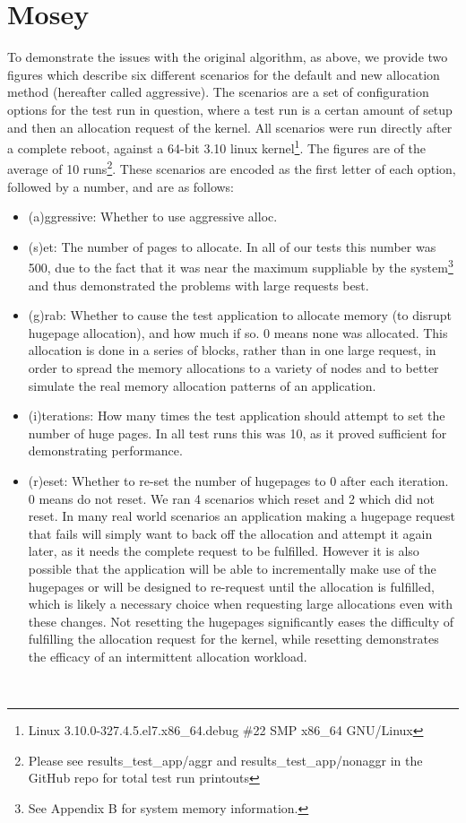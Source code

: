 \documentclass{article}
\begin{document}
\section{Mosey}
To demonstrate the issues with the original algorithm, as above, we provide two figures which describe six different scenarios for the default and new allocation method (hereafter called aggressive). The scenarios are a set of configuration options for the test run in question, where a test run is a certan amount of setup and then an allocation request of the kernel. All scenarios were run directly after a complete reboot, against a 64-bit 3.10 linux kernel\footnote{Linux 3.10.0-327.4.5.el7.x86\_64.debug \#22 SMP x86\_64 GNU/Linux}. The figures are of the average of 10 runs\footnote{Please see results\_test\_app/aggr and results\_test\_app/nonaggr in the GitHub repo for total test run printouts}. These scenarios are encoded as the first letter of each option, followed by a number, and are as follows:
\begin{itemize}
	\item (a)ggressive: Whether to use aggressive alloc.
	\item (s)et: The number of pages to allocate. In all of our tests this number was 500, due to the fact that it was near the maximum suppliable by the system\footnote{See Appendix B for system memory information.} and thus demonstrated the problems with large requests best.
	\item (g)rab: Whether to cause the test application to allocate memory (to disrupt hugepage allocation), and how much if so. 0 means none was allocated. This allocation is done in a series of blocks, rather than in one large request, in order to spread the memory allocations to a variety of nodes and to better simulate the real memory allocation patterns of an application.
	\item (i)terations: How many times the test application should attempt to set the number of huge pages. In all test runs this was 10, as it proved sufficient for demonstrating performance.
	\item (r)eset: Whether to re-set the number of hugepages to 0 after each iteration. 0 means do not reset. We ran 4 scenarios which reset and 2 which did not reset. In many real world scenarios an application making a hugepage request that fails will simply want to back off the allocation and attempt it again later, as it needs the complete request to be fulfilled. However it is also possible that the application will be able to incrementally make use of the hugepages or will be designed to re-request until the allocation is fulfilled, which is likely a necessary choice when requesting large allocations even with these changes. Not resetting the hugepages significantly eases the difficulty of fulfilling the allocation request for the kernel, while resetting demonstrates the efficacy of an intermittent allocation workload.
\end{itemize}\
\end{document}

